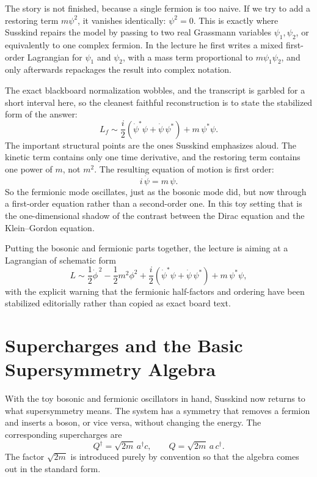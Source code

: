 The story is not finished, because a single fermion is too naive. If we try to add a restoring term \(m\psi^2\), it vanishes identically: \(\psi^2=0\). This is exactly where Susskind repairs the model by passing to two real Grassmann variables \(\psi_1,\psi_2\), or equivalently to one complex fermion. In the lecture he first writes a mixed first-order Lagrangian for \(\psi_1\) and \(\psi_2\), with a mass term proportional to \(m\psi_1\psi_2\), and only afterwards repackages the result into complex notation.

The exact blackboard normalization wobbles, and the transcript is garbled for a short interval here, so the cleanest faithful reconstruction is to state the stabilized form of the answer:
\begin{equation}
L_f \sim \frac{i}{2}\left(\dot\psi^\ast \psi+\dot\psi\,\psi^\ast\right)+m\,\psi^\ast\psi.
\end{equation}
The important structural points are the ones Susskind emphasizes aloud. The kinetic term contains only one time derivative, and the restoring term contains one power of \(m\), not \(m^2\). The resulting equation of motion is first order:
\begin{equation}
i\,\dot\psi = m\,\psi.
\end{equation}
So the fermionic mode oscillates, just as the bosonic mode did, but now through a first-order equation rather than a second-order one. In this toy setting that is the one-dimensional shadow of the contrast between the Dirac equation and the Klein--Gordon equation.

Putting the bosonic and fermionic parts together, the lecture is aiming at a Lagrangian of schematic form
\begin{equation}
L \sim \frac{1}{2}\dot\phi^{\,2}-\frac{1}{2}m^2\phi^2
+\frac{i}{2}\left(\dot\psi^\ast \psi+\dot\psi\,\psi^\ast\right)
+m\,\psi^\ast\psi,
\end{equation}
with the explicit warning that the fermionic half-factors and ordering have been stabilized editorially rather than copied as exact board text.

\section{Supercharges and the Basic Supersymmetry Algebra}

With the toy bosonic and fermionic oscillators in hand, Susskind now returns to what supersymmetry means. The system has a symmetry that removes a fermion and inserts a boson, or vice versa, without changing the energy. The corresponding supercharges are
\begin{equation}
Q^\dagger=\sqrt{2m}\,a^\dagger c,
\qquad
Q=\sqrt{2m}\,a\,c^\dagger.
\end{equation}
The factor \(\sqrt{2m}\) is introduced purely by convention so that the algebra comes out in the standard form.

